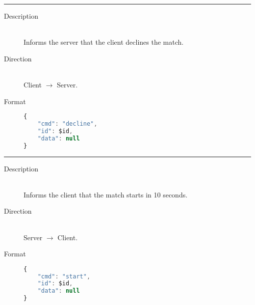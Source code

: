 \hrule

\begin{description}
\item[Description] \hfill \\
	Informs the server that the client declines the match.
\item[Direction] \hfill \\
	Client $\rightarrow$ Server.
\item[Format] \hfill
\begin{lstlisting}[language=JavaScript]
{
	"cmd": "decline",
	"id": $id,
	"data": null
}
\end{lstlisting}
\end{description}

\hrule

\begin{description}
\item[Description] \hfill \\
	Informs the client that the match starts in 10 seconds.
\item[Direction] \hfill \\
	Server $\rightarrow$ Client.
\item[Format] \hfill
\begin{lstlisting}[language=JavaScript]
{
	"cmd": "start",
	"id": $id,
	"data": null
}
\end{lstlisting}
\end{description}
